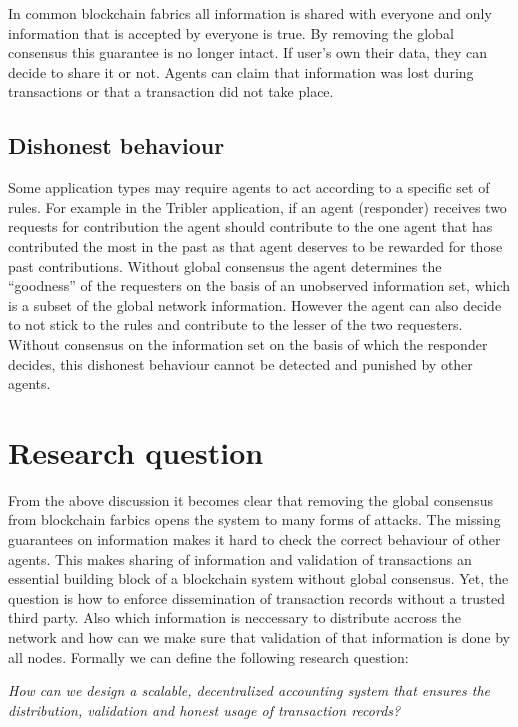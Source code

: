 In common blockchain fabrics all information is shared with everyone and only information that is 
accepted by everyone is true. By removing the global consensus this guarantee is no longer intact.
If user's own their data, they can decide to share it or not. Agents can claim that information was
lost during transactions or that a transaction did not take place.

\subsection{Dishonest behaviour}
Some application types may require agents to act according to a specific set of rules. For example
in the Tribler application, if an agent (responder) receives two requests for contribution the 
agent should contribute to the one agent that has contributed the most in the past as that agent 
deserves to be rewarded for those past contributions. Without global consensus the agent determines
the ``goodness'' of the requesters on the basis of an unobserved information set, which is a subset
of the global network information. However the agent can also decide to not stick to the rules and
contribute to the lesser of the two requesters. Without consensus on the information set on the 
basis of which the responder decides, this dishonest behaviour cannot be detected and punished by
other agents.

\section{Research question}
From the above discussion it becomes clear that removing the global consensus from blockchain
farbics opens the system to many forms of attacks. The missing guarantees on information makes it
hard to check the correct behaviour of other agents. This makes sharing of information and 
validation of transactions an essential building block of a blockchain system without global
consensus. Yet, the question is how to enforce dissemination of transaction records without a
trusted third party. Also which information is neccessary to distribute accross the network and how
can we make sure that validation of that information is done by all nodes. Formally we can define 
the following research question:

\begin{center}
    \textit{How can we design a scalable, decentralized accounting system that ensures the distribution,
    validation and honest usage of transaction records?}
\end{center}

 
